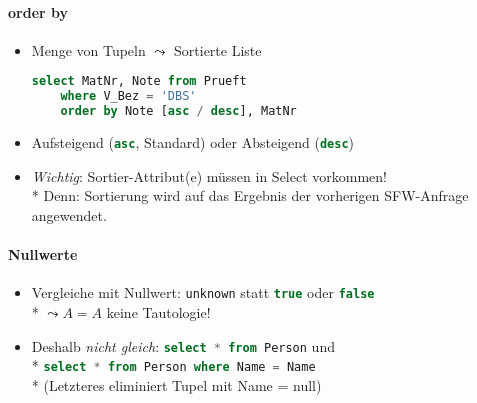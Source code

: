 \paragraph{order by}
\begin{itemize}
	\item Menge von Tupeln $\leadsto$ Sortierte Liste
	\begin{lstlisting}[language=sql]
select MatNr, Note from Prueft
	where V_Bez = 'DBS'
	order by Note [asc / desc], MatNr
	\end{lstlisting}
	\item Aufsteigend (\lstinline[language=sql]{asc}, Standard) oder Absteigend (\lstinline[language=sql]{desc})
	\item \emph{Wichtig}: Sortier-Attribut(e) müssen in Select vorkommen!\\*
	Denn: Sortierung wird auf das Ergebnis der vorherigen SFW-Anfrage angewendet.
\end{itemize}

\paragraph{Nullwerte}
\begin{itemize}
	\item Vergleiche mit Nullwert: \lstinline[language=sql]{unknown} statt \lstinline[language=sql]{true} oder \lstinline[language=sql]{false} \\*
	\( \leadsto A=A \) keine Tautologie!
	\item Deshalb \emph{nicht gleich}: \lstinline[language=sql]{select * from Person} und \\* \lstinline[language=sql]{select * from Person where Name = Name}\\*
	(Letzteres eliminiert Tupel mit Name = null)
\end{itemize}

